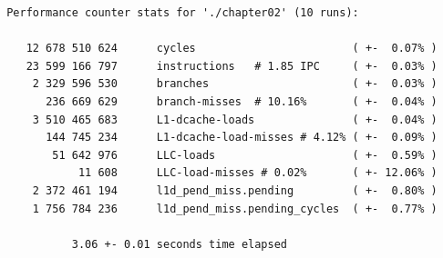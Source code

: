 \documentclass[12pt,a4paper,twoside,openright]{book}
\begin{document}
\begin{mdframed}[skipabove=\baselineskip,skipbelow=0pt,hidealllines=true,backgroundcolor=black!3,innerleftmargin=10pt,innerrightmargin=5pt,innertopmargin=0pt,innerbottommargin=5pt]
{\small
\begin{verbatim} Performance counter stats for './chapter02' (10 runs):

    12 678 510 624      cycles                        ( +-  0.07% )
    23 599 166 797      instructions   # 1.85 IPC     ( +-  0.03% )
     2 329 596 530      branches                      ( +-  0.03% )
       236 669 629      branch-misses  # 10.16%       ( +-  0.04% )
     3 510 465 683      L1-dcache-loads               ( +-  0.04% )
       144 745 234      L1-dcache-load-misses # 4.12% ( +-  0.09% )
        51 642 976      LLC-loads                     ( +-  0.59% )
            11 608      LLC-load-misses # 0.02%       ( +- 12.06% )
     2 372 461 194      l1d_pend_miss.pending         ( +-  0.80% )
     1 756 784 236      l1d_pend_miss.pending_cycles  ( +-  0.77% )

           3.06 +- 0.01 seconds time elapsed
\end{verbatim}
}
\end{mdframed}
\begin{mdframed}[skipabove=0pt,skipbelow=\baselineskip,hidealllines=true,innerleftmargin=10pt,innerrightmargin=5pt,innertopmargin=3pt,innerbottommargin=3pt]
\label{lst:perf_chapter02_2}
\end{mdframed}

\end{document}
